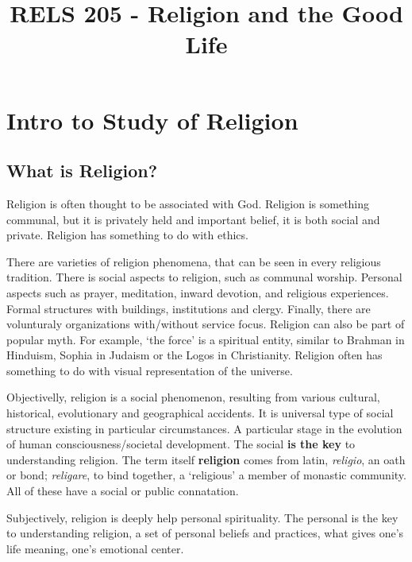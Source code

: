 \documentclass{article}
\title{RELS 205 - Religion and the Good Life}
\begin{document}
\maketitle
\tableofcontents

\section{Intro to Study of Religion}

\subsection{What is Religion?}

Religion is often thought to be associated with God. Religion is something communal, but it is privately held and important belief, it is both social and private. Religion has something to do with ethics.

There are varieties of religion phenomena, that can be seen in every religious tradition. There is social aspects to religion, such as communal worship. Personal aspects such as prayer, meditation, inward devotion, and religious experiences. Formal structures with buildings, institutions and clergy. Finally, there are volunturaly organizations with/without service focus. Religion can also be part of popular myth. For example, `the force' is a spiritual entity, similar to Brahman in Hinduism, Sophia in Judaism or the Logos in Christianity. Religion often has something to do with visual representation of the universe.

Objectivelly, religion is a social phenomenon, resulting from various cultural, historical, evolutionary and geographical accidents. It is universal type of social structure existing in particular circumstances. A particular stage in the evolution of human consciousness/societal development. The social \textbf{is the key} to understanding religion. The term itself \textbf{religion} comes from latin, \textit{religio}, an oath or bond; \textit{religare}, to bind together, a `religious' a member of monastic community. All of these have a social or public connatation.

Subjectively, religion is deeply help personal spirituality. The personal is the key to understanding religion, a set of personal beliefs and practices, what gives one's life meaning, one's emotional center.

\begin{center}
\end{center}
\end{document}
